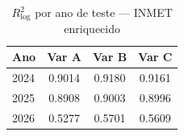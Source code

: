 \begin{table}[htbp]
\centering
\caption{$R^2_{\log}$ por ano de teste --- INMET enriquecido}
\label{tab:v4-r2-by-year}
\begin{tabular}{lccc}
\toprule
Ano & Var A & Var B & Var C \\
\midrule
    2024 & 0.9014 & 0.9180 & 0.9161 \\
    2025 & 0.8908 & 0.9003 & 0.8996 \\
    2026 & 0.5277 & 0.5701 & 0.5609 \\
\bottomrule
\end{tabular}
\end{table}
